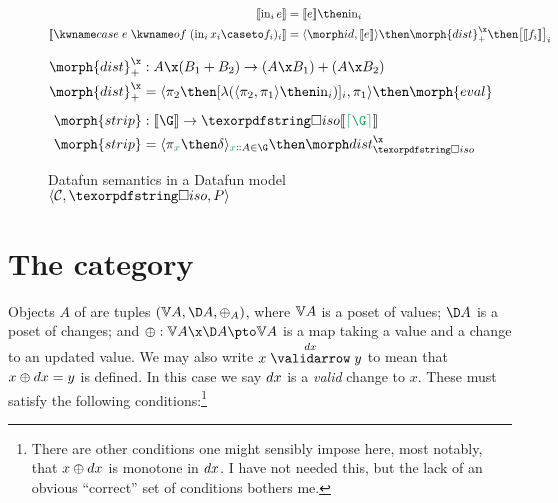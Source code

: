 \documentclass[nomarginums]{rntz}\usepackage[tablet]{fantasy}%
\begin{document}
\begin{figure*}
  \begin{align*}
    \den{\inj i e} &= \den{e} \then \injc_i
    \\
    \den{\ecase{e} (\inj i{x_i} \caseto f_i)_i} &=
    \fork{\id, \den{e}} \then \morph{dist}^\x_+ \then \bigkrof{\den{f_i}}_i
  \end{align*}

  \vspace{.5\baselineskip}

  \begin{align*}
    \morph{dist}^\x_+ &: A \x (B_1 + B_2) \to (A \x B_1) + (A \x B_2)\\
    \morph{dist}^\x_+ &= \fork{\pi_2 \then \krof{\lambda (\fork{\pi_2,\pi_1} \then \injc_i)}_i, \pi_1}
    \then \morph{eval}
    \\[1ex]
    \morph{strip} &: \den\G \to \discof{\den{\stripcxd\G}}\\
    \morph{strip} &= \fork{\pi_{\dvar x} \then \delta}_{\hd x A \in \G} \then \discox
  \end{align*}


  \caption{Datafun semantics in a Datafun model $\tuple{\catC, \disco, \pfin}$}
  \label{fig:general-semantics}
\end{figure*}


\section{The category \CP}
\label{sec:changeposets}

Objects $A$ of \CP{} are tuples $(\vals A, \chgs A, \updfn_A)$, where
%
$\mathbb{V} A$ is a poset of values;
%
$\chgs A$ is a poset of changes;
%
and $\updfn : \vals A \x \chgs A \pto \vals A$ is a  map taking
a value and a change to an updated value.
%
We may also write $\vld{\dx} x y$ to mean that $x \mathbin{\oplus} dx = y$ is defined. In
this case we say $dx$ is a \emph{valid} change to $x$.
%
These must satisfy the following conditions:\footnote{There are other conditions
  one might sensibly impose here, most notably, that $x \mathbin{\oplus} dx$ is monotone in
  $dx$. I have not needed this, but the lack of an obvious ``correct'' set of
  conditions bothers me.}
\end{document}
